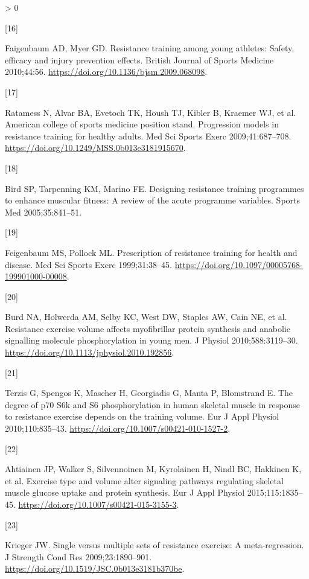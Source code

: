 \documentclass[twoside,10pt]{gihclass} %
\newlength{\cslhangindent}
\newlength{\csllabelwidth}
\newenvironment{CSLReferences}[3] %
 {%
  \setlength{\parindent}{0pt}
  \ifodd #1 \everypar{\setlength{\hangindent}{\cslhangindent}}\ignorespaces\fi
  \ifnum #2 > 0
  \setlength{\parskip}{#2\baselineskip}
  \fi
 }%
 {}
\newcommand{\CSLLeftMargin}[1]{\parbox[t]{\maxof{\widthof{#1}}{\csllabelwidth}}{#1}}
\newcommand{\CSLRightInline}[1]{\parbox[t]{\linewidth}{#1}}
\begin{document}
\begin{CSLReferences}{0}{0}
\leavevmode\hypertarget{ref-RN2536}{}%
\CSLLeftMargin{{[}16{]} }
\CSLRightInline{Faigenbaum AD, Myer GD. Resistance training among young athletes: Safety, efficacy and injury prevention effects. British Journal of Sports Medicine 2010;44:56. \url{https://doi.org/10.1136/bjsm.2009.068098}.}

\leavevmode\hypertarget{ref-RN1}{}%
\CSLLeftMargin{{[}17{]} }
\CSLRightInline{Ratamess N, Alvar BA, Evetoch TK, Housh TJ, Kibler B, Kraemer WJ, et al. American college of sports medicine position stand. Progression models in resistance training for healthy adults. Med Sci Sports Exerc 2009;41:687--708. \url{https://doi.org/10.1249/MSS.0b013e3181915670}.}

\leavevmode\hypertarget{ref-RN798}{}%
\CSLLeftMargin{{[}18{]} }
\CSLRightInline{Bird SP, Tarpenning KM, Marino FE. Designing resistance training programmes to enhance muscular fitness: A review of the acute programme variables. Sports Med 2005;35:841--51.}

\leavevmode\hypertarget{ref-RN2538}{}%
\CSLLeftMargin{{[}19{]} }
\CSLRightInline{Feigenbaum MS, Pollock ML. Prescription of resistance training for health and disease. Med Sci Sports Exerc 1999;31:38--45. \url{https://doi.org/10.1097/00005768-199901000-00008}.}

\leavevmode\hypertarget{ref-RN791}{}%
\CSLLeftMargin{{[}20{]} }
\CSLRightInline{Burd NA, Holwerda AM, Selby KC, West DW, Staples AW, Cain NE, et al. Resistance exercise volume affects myofibrillar protein synthesis and anabolic signalling molecule phosphorylation in young men. J Physiol 2010;588:3119--30. \url{https://doi.org/10.1113/jphysiol.2010.192856}.}

\leavevmode\hypertarget{ref-RN784}{}%
\CSLLeftMargin{{[}21{]} }
\CSLRightInline{Terzis G, Spengos K, Mascher H, Georgiadis G, Manta P, Blomstrand E. The degree of p70 S6k and S6 phosphorylation in human skeletal muscle in response to resistance exercise depends on the training volume. Eur J Appl Physiol 2010;110:835--43. \url{https://doi.org/10.1007/s00421-010-1527-2}.}

\leavevmode\hypertarget{ref-RN1837}{}%
\CSLLeftMargin{{[}22{]} }
\CSLRightInline{Ahtiainen JP, Walker S, Silvennoinen M, Kyrolainen H, Nindl BC, Hakkinen K, et al. Exercise type and volume alter signaling pathways regulating skeletal muscle glucose uptake and protein synthesis. Eur J Appl Physiol 2015;115:1835--45. \url{https://doi.org/10.1007/s00421-015-3155-3}.}

\leavevmode\hypertarget{ref-RN793}{}%
\CSLLeftMargin{{[}23{]} }
\CSLRightInline{Krieger JW. Single versus multiple sets of resistance exercise: A meta-regression. J Strength Cond Res 2009;23:1890--901. \url{https://doi.org/10.1519/JSC.0b013e3181b370be}.}


\end{CSLReferences}
\end{document}
